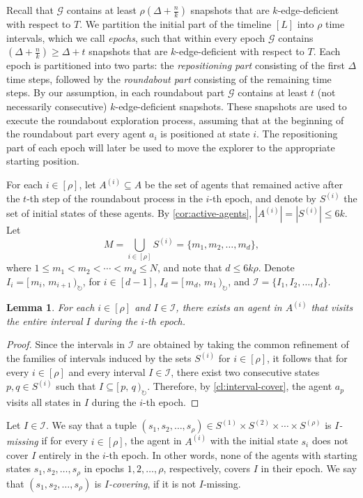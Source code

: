 \documentclass[a4paper,11pt]{article}
\newtheorem{lemma}[theorem]{Lemma}
\theoremstyle{definition}
\theoremstyle{remark}
\newcommand{\cG}{\ensuremath{\mathcal{G}}}
\newcommand{\bfI}{\ensuremath{\mathcal{I}}}
\newcommand{\coint}[2]{[\,#1,\,#2\,)_{\circlearrowright}}
\begin{document}
    Recall that $\cG$ contains at least $\rho(\Delta+ \frac{n}{k})$ snapshots that are $k$-edge-deficient with respect to $T$.
    We partition the initial part of the timeline $[L]$ into $\rho$ time intervals, which we call \emph{epochs}, such that  within every epoch $\cG$ contains $(\Delta+ \frac{n}{k}) \geq \Delta + t$ snapshots that are $k$-edge-deficient  with respect to $T$.
    Each epoch is partitioned into two parts: the \emph{repositioning part} consisting of the first $\Delta$ time steps,
    followed by the \emph{roundabout part} consisting of the remaining time steps. By our assumption, in each roundabout part $\cG$ contains at least $t$ (not necessarily consecutive) $k$-edge-deficient snapshots.
    These snapshots are used to  execute the roundabout exploration process, assuming that
    at the beginning of the roundabout part every agent $a_i$ is positioned at state $i$.
    The repositioning part of each epoch will later be used to move the explorer to the
    appropriate starting position.

    For each $i \in [\rho]$, let $A^{(i)} \subseteq A$ be the set of agents that remained active after the $t$-th step of the roundabout process in the $i$-th epoch, and denote by $S^{(i)}$ the set of initial states of these agents. By \cref{cor:active-agents}, $|A^{(i)}| = |S^{(i)}| \leq 6k$.
    Let
    \[
        M = \bigcup_{i \in [\rho]} S^{(i)} = \{ m_1, m_2, \ldots, m_d \},
    \]
    where $1 \leq m_1 < m_2 < \cdots < m_d \leq N$, and note that $d \leq  6k\rho$.
    Denote $I_i = \coint{m_i}{m_{i+1}}$,
    for $i \in [d-1]$, $I_d = \coint{m_d}{m_{1}}$, and $\bfI = \{ I_1, I_2, \ldots, I_d \}$.
    
    \begin{lemma}\label{lem:visited-interval}
        For each $i \in [\rho]$ and $I \in \bfI$,  there exists an agent in $A^{(i)}$ that visits the entire interval $I$ during the $i$-th epoch.
    \end{lemma}
    \begin{proof}
        Since the intervals in $\bfI$ are obtained by taking the common refinement of the families of intervals induced by the sets $S^{(i)}$ for $i \in [\rho]$, it follows that for every $i \in [\rho]$ and every interval $I \in \bfI$, there exist two consecutive states $p, q \in S^{(i)}$ such that $I \subseteq \coint{p}{q}$. Therefore, by \cref{cl:interval-cover}, the agent $a_p$ visits all states in $I$ during the $i$-th epoch.
    \end{proof}

    Let $I \in \bfI$. We say that a tuple $(s_1, s_2, \ldots, s_{\rho}) \in S^{(1)} \times S^{(2)} \times \cdots \times S^{(\rho)}$ is \emph{$I$-missing} if for every $i \in [\rho]$, the agent in $A^{(i)}$ with the initial state $s_i$ does not cover $I$ entirely in the $i$-th epoch. In other words, none of the agents with starting states $s_1, s_2, \ldots, s_{\rho}$ in epochs $1,2, \ldots, \rho$, respectively, covers $I$ in their epoch. We say that $(s_1, s_2, \ldots, s_{\rho})$ is \emph{$I$-covering}, if it is not $I$-missing. 
    
\end{document}
